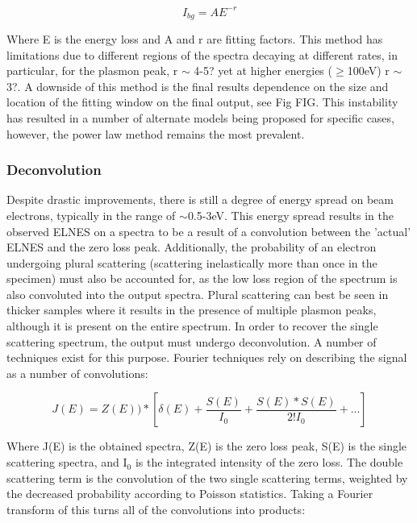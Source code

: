\begin{equation}
I_{bg} = AE^{-r}
\end{equation}

Where E is the energy loss and A and r are fitting factors.  This method has limitations due to different regions of the spectra decaying at different rates, in particular, for the plasmon peak, r $\sim$ 4-5? yet at higher energies ($\ge$100eV) r $\sim$ 3?.  A downside of this method is the final results dependence on the size and location of the fitting window on the final output, see Fig FIG.  This instability has resulted in a number of alternate models being proposed for specific cases, however, the power law method remains the most prevalent.  

\subsubsection{Deconvolution}
Despite drastic improvements, there is still a degree of energy spread on beam electrons, typically in the range of $\sim$0.5-3eV.  This energy spread results in the observed ELNES on a spectra to be a result of a convolution between the 'actual' ELNES and the zero loss peak.  Additionally, the probability of an electron undergoing plural scattering (scattering inelastically more than once in the specimen) must also be accounted for, as the low loss region of the spectrum is also convoluted into the output spectra.  Plural scattering can best be seen in thicker samples where it results in the presence of multiple plasmon peaks, although it is present on the entire spectrum.  In order to recover the single scattering spectrum, the output must undergo deconvolution.  A number of techniques exist for this purpose.   Fourier techniques rely on describing the signal as a number of convolutions:

\begin{equation}
J(E) = Z(E))\ast[\delta(E) + \frac{S(E)}{I_0} +  \frac{S(E) \ast S(E)}{2! I_0}   + ...]
\end{equation}



Where J(E) is the obtained spectra, Z(E) is the zero loss peak, S(E) is the single scattering spectra, and I$_0$ is the integrated intensity of the zero loss.  The double scattering term is the convolution of the two single scattering terms, weighted by the decreased probability according to Poisson statistics.   Taking a Fourier transform of this turns all of the convolutions into products: 

